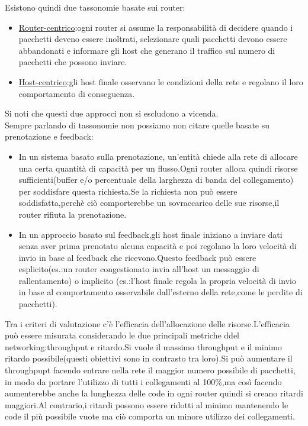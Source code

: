 Esistono quindi due tassonomie basate sui router:
\begin{itemize}
  \item \underline{Router-centrico}:ogni router si assume la responsabilità di decidere quando i pacchetti deveno essere inoltrati, selezionare quali pacchetti devono essere abbandonati e informare gli host che generano il traffico sul numero di pacchetti che possono inviare.
  \item \underline{Host-centrico}:gli host finale osservano le condizioni della rete e regolano il loro comportamento di conseguenza.
\end{itemize}
Si noti che questi due approcci non si escludono a vicenda.\\
Sempre parlando di tassonomie non possiamo non citare quelle basate su prenotazione e feedback:
\begin{itemize}
  \item In un sistema basato sulla prenotazione, un'entità chiede alla rete di allocare una certa quantità di capacità per un flusso.Ogni router alloca quindi risorse sufficienti(buffer e/o percentuale della larghezza di banda del collegamento) per soddisfare questa richiesta.Se la richiesta non può essere soddisfatta,perchè ciò comporterebbe un sovraccarico delle sue risorse,il router rifiuta la prenotazione.
  \item In un approccio basato sul feedback,gli host finale iniziano a inviare dati senza aver prima prenotato alcuna capacità e poi regolano la loro velocità di invio in base al feedback che ricevono.Questo feedback può essere esplicito(es.:un router congestionato invia all'host un messaggio di rallentamento) o implicito (es.:l'host finale regola la propria velocità di invio in base al comportamento osservabile dall'esterno della rete,come le perdite di pacchetti).
\end{itemize}
Tra i criteri di valutazione c'è l'efficacia dell'allocazione delle risorse.L'efficacia può essere misurata considerando le due principali metriche ddel networking:throughput e ritardo.Si vuole il massimo throughput e il minimo ritardo possibile(questi obiettivi sono in contrasto tra loro).Si può aumentare il throughpupt facendo entrare nella rete il maggior numero possibile di pacchetti, in modo da portare l'utilizzo di tutti i collegamenti al 100\%,ma così facendo aumenterebbe anche la lunghezza delle code in ogni router quindi si creano ritardi maggiori.Al contrario,i ritardi possono essere ridotti al minimo mantenendo le code il più possibile vuote ma ciò comporta un minore utilizzo dei collegamenti.
